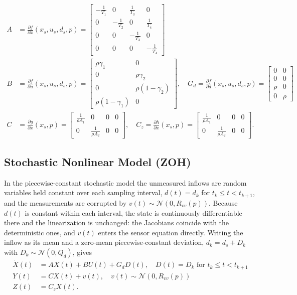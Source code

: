 \begin{align}
    A &= \frac{\partial f}{\partial x}(x_s, u_s, d_s, p) =
    \begin{bmatrix}
        -\frac{1}{T_1} & 0 & \frac{1}{T_3} & 0 \\
        0 & -\frac{1}{T_2} & 0 & \frac{1}{T_4} \\
        0 & 0 & -\frac{1}{T_3} & 0 \\
        0 & 0 & 0 & -\frac{1}{T_4}
    \end{bmatrix} \\
    B &= \frac{\partial f}{\partial u}(x_s, u_s, d_s, p) =
    \begin{bmatrix}
        \rho \gamma_1 & 0 \\
        0 & \rho \gamma_2 \\
        0 & \rho(1 - \gamma_2) \\
        \rho(1 - \gamma_1) & 0
    \end{bmatrix}, \quad
    G_d = \frac{\partial f}{\partial d}(x_s, u_s, d_s, p) =
    \begin{bmatrix}
        0 & 0 \\
        0 & 0 \\
        \rho & 0 \\
        0 & \rho
    \end{bmatrix} \\
    C &= \frac{\partial g}{\partial x}(x_s, p) =
    \begin{bmatrix}
        \frac{1}{\rho A_1} & 0 & 0 & 0 \\
        0 & \frac{1}{\rho A_2} & 0 & 0
    \end{bmatrix}, \quad
    C_z = \frac{\partial h}{\partial x}(x_s, p) =
    \begin{bmatrix}
        \frac{1}{\rho A_1} & 0 & 0 & 0 \\
        0 & \frac{1}{\rho A_2} & 0 & 0
    \end{bmatrix}.
\end{align}

\subsection{Stochastic Nonlinear Model (ZOH)}

In the piecewise-constant stochastic model the unmeasured inflows are random
variables held constant over each sampling interval, $d(t) = d_k$ for
$t_k \le t < t_{k+1}$, and the measurements are corrupted by
$v(t) \sim \mathcal{N}(0, R_{vv}(p))$. Because $d(t)$ is constant within each
interval, the state is continuously differentiable there and the linearization
is unchanged: the Jacobians coincide with the deterministic ones, and $v(t)$
enters the sensor equation directly. Writing the inflow as its mean and a
zero-mean piecewise-constant deviation, $d_k = d_s + D_k$ with
$D_k \sim \mathcal{N}(0, Q_d)$, gives
\begin{align}
    \dot{X}(t) &= A X(t) + B U(t) + G_d D(t), \quad D(t) = D_k \text{ for } t_k \le t < t_{k+1} \\
    Y(t) &= C X(t) + v(t), \quad v(t) \sim \mathcal{N}(0, R_{vv}(p)) \\
    Z(t) &= C_z X(t).
\end{align}

